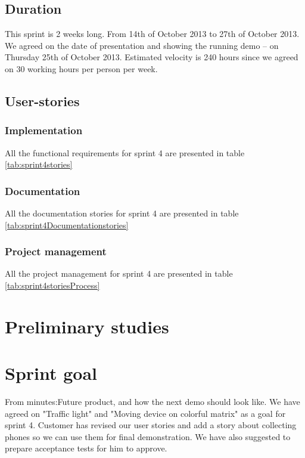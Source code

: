 \subsection{Duration}
This sprint is 2 weeks long. From 14th of October 2013 to 27th of October 2013. We agreed
on the date of presentation and showing the running demo – on Thursday 25th of October 2013.
Estimated velocity is 240 hours since we agreed on 30 working hours per person per week.
\subsection{User-stories}
\subsubsection*{Implementation}
All the functional requirements for sprint 4 are presented in table \ref{tab:sprint4stories}

\subsubsection*{Documentation}
All the documentation stories for sprint 4 are presented in table \ref{tab:sprint4Documentationstories}

\subsubsection*{Project management}
All the project management for sprint 4 are presented in table \ref{tab:sprint4storiesProcess}

\section{Preliminary studies}
\section{Sprint goal}
From  minutes:Future product, and how the next demo should look like. We have agreed on "Traffic
light" and "Moving device on colorful matrix" as a goal for sprint 4. Customer has revised our user stories and add a story about collecting phones so we can use them for final demonstration. We have also suggested to prepare acceptance tests for him to approve.
